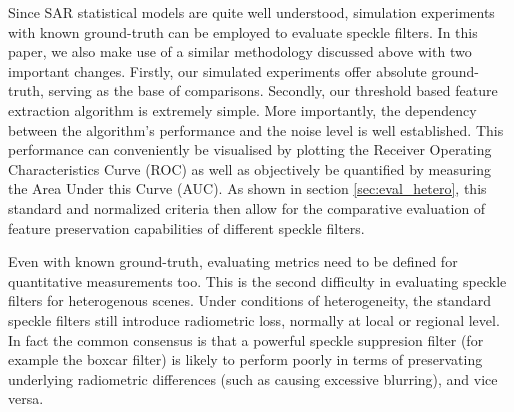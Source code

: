 \documentclass[journal]{IEEEtran}
\begin{document}
Since SAR statistical models are quite well understood, 
	simulation experiments with known ground-truth can be employed 
		to evaluate speckle filters.
In this paper, we also make use of a similar methodology discussed above with two important changes.
Firstly, our simulated experiments offer absolute ground-truth, serving as the base of comparisons.
Secondly, our threshold based feature extraction algorithm is extremely simple.
More importantly, the dependency between the algorithm's performance and the noise level is well established. 
This performance 
	can conveniently be visualised by plotting the Receiver Operating Characteristics Curve (ROC) 
	as well as objectively be quantified by measuring the Area Under this Curve (AUC). 
As shown in section \ref{sec:eval_hetero}, this standard and normalized criteria then allow for the comparative evaluation of feature preservation capabilities of different speckle filters.

%

Even with known ground-truth, evaluating metrics need to be defined for quantitative measurements too.
This is the second difficulty in evaluating speckle filters for heterogenous scenes.
Under conditions of heterogeneity, the standard speckle filters still introduce radiometric loss, normally at local or regional level.
In fact the common consensus is that a powerful speckle suppresion filter (for example the boxcar filter) is likely to perform poorly in terms of preservating underlying radiometric differences (such as causing excessive blurring), and vice versa. 
\end{document}
